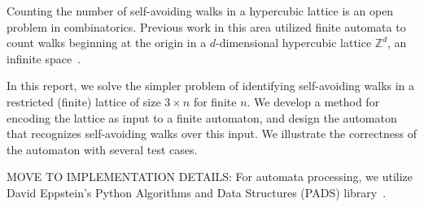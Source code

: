 Counting the number of self-avoiding walks in a hypercubic lattice is an open problem in combinatorics. Previous work in this area utilized finite automata to count walks beginning at the origin in a $d$-dimensional hypercubic lattice $\mathbb{Z}^d$, an infinite space~\cite{ponitz:walks:ejc:2000}. 

In this report, we solve the simpler problem of identifying self-avoiding walks in a restricted (finite) lattice of size $3\times n$ for finite $n$. We develop a method for encoding the lattice as input to a finite automaton, and design the automaton that recognizes self-avoiding walks over this input. We illustrate the correctness of the automaton with several test cases. 

MOVE TO IMPLEMENTATION DETAILS: For automata processing, we utilize David Eppstein's Python Algorithms and Data Structures (PADS) library~\cite{eppstein:automata:www:2013}.
